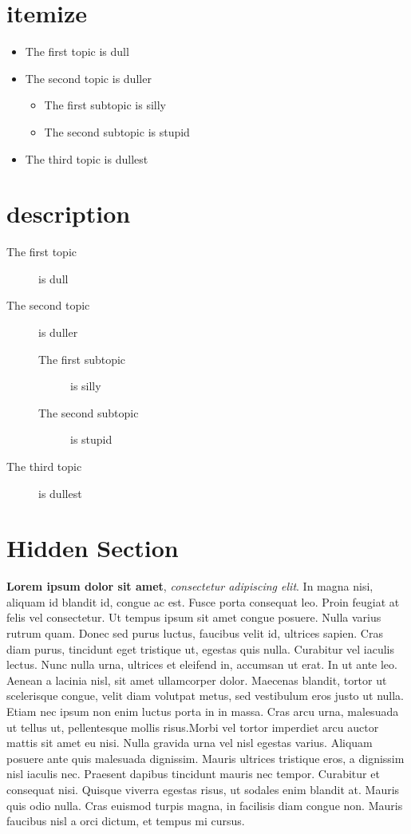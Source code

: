 \section*{itemize}
\begin{itemize}
\item The first topic is dull
\item The second topic is duller
\begin{itemize}
\item The first subtopic is silly
\item The second subtopic is stupid
\end{itemize}
\item The third topic is dullest
\end{itemize}

\section*{description}
\begin{description}
\item[The first topic] is dull
\item[The second topic] is duller
\begin{description}
\item[The first subtopic] is silly
\item[The second subtopic] is stupid
\end{description}
\item[The third topic] is dullest
\end{description}


\clearpage

\tochide\section{Hidden Section}
\textbf{Lorem ipsum dolor sit amet}, \textit{consectetur adipiscing elit}. In magna nisi, aliquam id blandit id, congue ac est. Fusce porta consequat leo. Proin feugiat at felis vel consectetur. Ut tempus ipsum sit amet congue posuere. Nulla varius rutrum quam. Donec sed purus luctus, faucibus velit id, ultrices sapien. Cras diam purus, tincidunt eget tristique ut, egestas quis nulla. Curabitur vel iaculis lectus. Nunc nulla urna, ultrices et eleifend in, accumsan ut erat. In ut ante leo. Aenean a lacinia nisl, sit amet ullamcorper dolor. Maecenas blandit, tortor ut scelerisque congue, velit diam volutpat metus, sed vestibulum eros justo ut nulla. Etiam nec ipsum non enim luctus porta in in massa. Cras arcu urna, malesuada ut tellus ut, pellentesque mollis risus.Morbi vel tortor imperdiet arcu auctor mattis sit amet eu nisi. Nulla gravida urna vel nisl egestas varius. Aliquam posuere ante quis malesuada dignissim. Mauris ultrices tristique eros, a dignissim nisl iaculis nec. Praesent dapibus tincidunt mauris nec tempor. Curabitur et consequat nisi. Quisque viverra egestas risus, ut sodales enim blandit at. Mauris quis odio nulla. Cras euismod turpis magna, in facilisis diam congue non. Mauris faucibus nisl a orci dictum, et tempus mi cursus.


